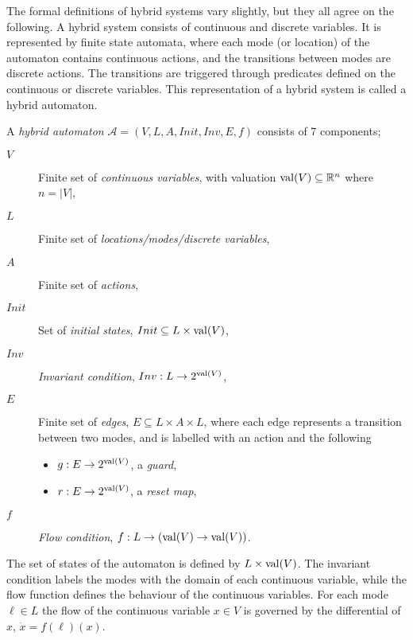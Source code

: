 The formal definitions of hybrid systems vary slightly, but they all agree on the following. A hybrid system consists of continuous and discrete variables. It is represented by finite state automata, where each mode (or location) of the automaton contains continuous actions, and the transitions between modes are discrete actions. The transitions are triggered through predicates defined on the continuous or discrete variables. This representation of a hybrid system is called a hybrid automaton.

\begin{defi}
A \emph{hybrid automaton} $\mathcal{A}=(V,L,A,Init,Inv,E,f)$ consists of 7 components;
\begin{description}
    \item[$V$]{Finite set of \emph{continuous variables}, with valuation $\operatorname{val}(V)\subseteq\mathbb{R}^n$ where $n=|V|$,}
    \item[$L$]{Finite set of \emph{locations/modes/discrete variables},}
    \item[$A$]{Finite set of \emph{actions},}
    \item[$Init$]{Set of \emph{initial states}, $Init\subseteq L \times \operatorname{val}(V)$,}
    \item[$Inv$]{\emph{Invariant condition}, $Inv: L \rightarrow 2^{\operatorname{val}(V)}$,}
    \item[$E$]{Finite set of \emph{edges}, $E\subseteq L\times A\times L$, where each edge represents a transition between two modes, and is labelled with an action and the following
        \begin{itemize}
            \item{$g : E \rightarrow 2^{\operatorname{val}(V)}$, a \emph{guard},}
            \item{$r : E \rightarrow 2^{\operatorname{val}(V)}$, a \emph{reset map},}
        \end{itemize}}
    \item[$f$]{\emph{Flow condition}, $f: L\rightarrow (\operatorname{val}(V)\rightarrow\operatorname{val}(V))$.}
\end{description}
\end{defi}

The set of states of the automaton is defined by $L\times\operatorname{val}(V)$. The invariant condition labels the modes with the domain of each continuous variable, while the flow function defines the behaviour of the continuous variables. For each mode $\ell\in L$ the flow of the continuous variable $x\in V$ is governed by the differential of $x$, $\dot{x}=f(\ell)(x)$.

